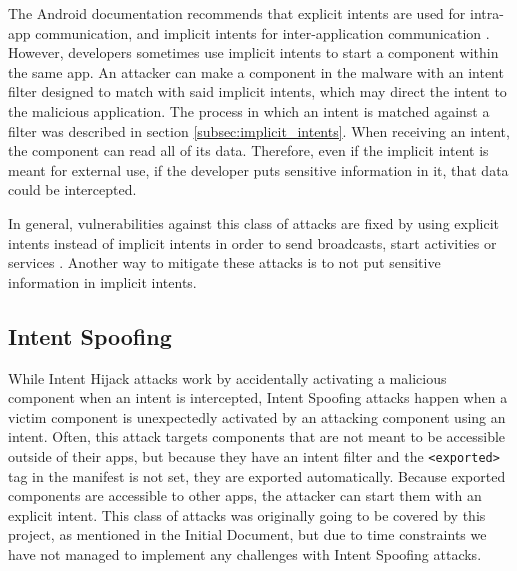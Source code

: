     The Android documentation recommends that explicit intents are used for intra-app communication, and implicit intents for inter-application communication \cite{intents_and_intent_filters}. However, developers sometimes use implicit intents to start a component within the same app. An attacker can make a component in the malware with an intent filter designed to match with said implicit intents, which may direct the intent to the malicious application. The process in which an intent is matched against a filter was described in section \ref{subsec:implicit_intents}. When receiving an intent, the component can read all of its data. Therefore, even if the implicit intent is meant for external use, if the developer puts sensitive information in it, that data could be intercepted.
    
    In general, vulnerabilities against this class of attacks are fixed by using explicit intents instead of implicit intents in order to send broadcasts, start activities or services \cite{2010_icc_paper}. Another way to mitigate these attacks is to not put sensitive information in implicit intents.
    
    \subsection{Intent Spoofing}
        \label{subsec:intent_spoofing}
        
    While Intent Hijack attacks work by accidentally activating a malicious component when an intent is intercepted, Intent Spoofing attacks happen when a victim component is unexpectedly activated by an attacking component using an intent. Often, this attack targets components that are not meant to be accessible outside of their apps, but because they have an intent filter and the \lstinline|<exported>| tag in the manifest is not set, they are exported automatically. Because exported components are accessible to other apps, the attacker can start them with an explicit intent. This class of attacks was originally going to be covered by this project, as mentioned in the Initial Document, but due to time constraints we have not managed to implement any challenges with Intent Spoofing attacks.
    